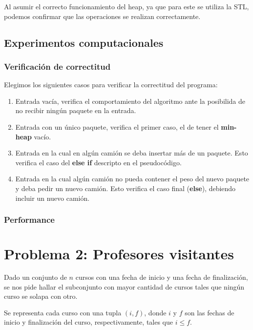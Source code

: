 \documentclass[a4paper,10pt,twoside]{article}
\begin{document}
Al asumir el correcto funcionamiento del heap, ya que para este se utiliza la STL, podemos  confirmar que las operaciones se realizan correctamente.

\subsection{Experimentos computacionales}
\subsubsection{Verificación de correctitud}
Elegimos los siguientes casos para verificar la correctitud del programa:
\begin{enumerate}
	\item Entrada vacía, verifica el comportamiento del algoritmo ante la posibilida de no recibir ningún paquete en la entrada.
	\item Entrada con un único paquete, verifica el primer caso, el de tener el \textbf{min-heap} vacío.
	\item Entrada en la cual en algún camión se deba insertar más de un paquete. Esto verifica el caso del \textbf{else if} descripto en el pseudocódigo.
	\item Entrada en la cual algún camión no pueda contener el peso del nuevo paquete y deba pedir un nuevo camión. Esto verifica el caso final (\textbf{else}), debiendo incluir un nuevo camión.
\end{enumerate}

\subsubsection{Performance}




\section{Problema 2: Profesores visitantes}

Dado un conjunto de $n$ cursos con una fecha de inicio y una fecha de finalización, se nos pide hallar el subconjunto con mayor cantidad de cursos tales que ningún curso se solapa con otro.

Se representa cada curso con una tupla $(i, f)$, donde $i$ y $f$ son las fechas de inicio y finalización del curso, respectivamente, tales que $i \leq f$.
\end{document}
